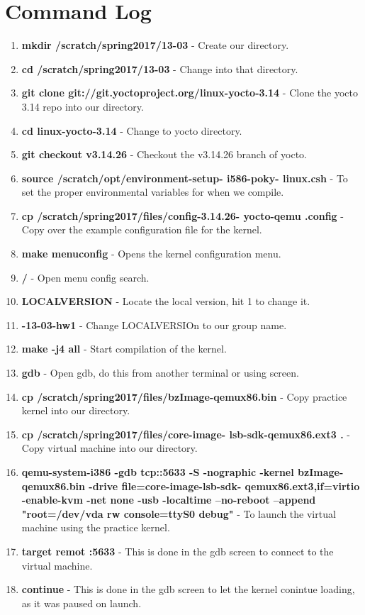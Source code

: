 \documentclass[10pt,draftclsnofoot,onecolumn, compsoc]{IEEEtran}
\begin{document}
\section{Command Log}
\begin{enumerate}
	\item {\bf mkdir /scratch/spring2017/13-03 } - Create our directory.
	\item {\bf cd /scratch/spring2017/13-03} - Change into that directory.
	\item {\bf git clone git://git.yoctoproject.org/linux-yocto-3.14} - Clone the yocto 3.14 repo into our directory.
	\item {\bf cd linux-yocto-3.14} - Change to yocto directory.
	\item {\bf git checkout v3.14.26} - Checkout the v3.14.26 branch of yocto.
	\item {\bf source /scratch/opt/environment-setup- i586-poky- linux.csh} - To set the proper environmental variables for when we compile.
	\item {\bf cp /scratch/spring2017/files/config-3.14.26- yocto-qemu .config} - Copy over the example configuration file for the kernel.
	\item {\bf make menuconfig} - Opens the kernel configuration menu.
	\item {\bf /} - Open menu config search.
	\item {\bf LOCALVERSION} - Locate the local version, hit 1 to change it.
	\item {\bf -13-03-hw1} - Change LOCALVERSIOn to our group name.
	\item {\bf make -j4 all} - Start compilation of the kernel.
	\item {\bf gdb} - Open gdb, do this from another terminal or using screen.
	\item {\bf cp /scratch/spring2017/files/bzImage-qemux86.bin} - Copy practice kernel into our directory.
	\item {\bf cp /scratch/spring2017/files/core-image- lsb-sdk-qemux86.ext3 .} - Copy virtual machine into our directory.
	\item {\bf qemu-system-i386 -gdb tcp::5633 -S -nographic -kernel bzImage-qemux86.bin -drive file=core-image-lsb-sdk- qemux86.ext3,if=virtio -enable-kvm -net none -usb -localtime --no-reboot --append "root=/dev/vda rw console=ttyS0 debug"} - To launch the virtual machine using the practice kernel.
	\item {\bf target remot :5633} - This is done in the gdb screen to connect to the virtual machine.
	\item {\bf continue} - This is done in the gdb screen to let the kernel conintue loading, as it was paused on launch.

\end{enumerate}
\end{document}
